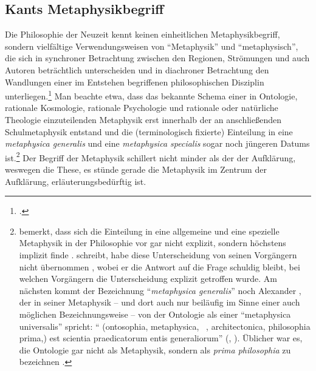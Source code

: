 \subsection{Kants
Metaphysikbegriff}\label{paragraph:facettendesmetaphysikbegriffs} Die
Philosophie der Neuzeit kennt keinen einheitlichen Metaphysikbegriff, sondern
vielfältige Verwendungsweisen von \enquote{Metaphysik} und
\enquote{metaphysisch}, die sich in synchroner Betrachtung zwischen den
Regionen, Strömungen und auch Autoren beträchtlich unterscheiden und in
diachroner Betrachtung den Wandlungen einer im Entstehen begriffenen
philosophischen Disziplin
unterliegen.\footnote{\cite[Vgl.][]{Borsche:ArtikelMetaphysikVI.Neuzeit1980}.}
Man beachte etwa, dass das bekannte Schema einer in Ontologie, rationale
Kosmologie, rationale Psychologie und rationale oder natürliche Theologie
einzuteilenden Metaphysik erst innerhalb der an
 anschließenden Schulmetaphysik entstand und die (terminologisch
fixierte) Einteilung in eine \textit{metaphysica generalis} und eine
\textit{metaphysica specialis} sogar noch jüngeren Datums
ist.\footnote{
bemerkt, dass sich die Einteilung in eine allgemeine und eine spezielle
Metaphysik in der Philosophie vor  gar nicht explizit,
sondern höchstens implizit finde
\parencite[vgl.][258--263]{Vollrath:DieGliederungderMetaphysikineineMetaphysicaGeneralisundeineMetaphysicaSpecialis1962}.
 schreibt,
 habe diese
Unterscheidung von seinen Vorgängern nicht übernommen
\parencite[vgl.][105]{Albrecht:ChristianWolffundderWolffianismus2014}, wobei er
die Antwort auf die Frage schuldig bleibt, bei welchen Vorgängern die
Unterscheidung explizit getroffen wurde. Am nächsten kommt der Bezeichnung
\enquote{\emph{metaphysica generalis}} noch Alexander
, der in seiner Metaphysik
-- und dort auch nur beiläufig im Sinne einer auch möglichen Bezeichnungsweise
-- von der Ontologie als einer \enquote{metaphysica universalis} spricht:
\enquote{ (ontosophia, metaphysica, \punkt\ , architectonica, philosophia prima,) est scientia praedicatorum
entis generaliorum}
\mkbibparens{\cite[][\S~4]{Baumgarten:Metaphysica---Metaphysik2011},
\cite[][XVII: 24.5--6]{Kant:GesammelteWerke1900ff.}}. Üblicher war es, die
Ontologie gar nicht als Metaphysik, sondern als \textit{prima philosophia} zu
bezeichnen \parencite[z.\,B.][]{Wolff:Philosophiaprimasiveontologia1977}.}
Der Begriff der Metaphysik schillert nicht minder als der der Aufklärung, weswegen die These, es
stünde gerade die Metaphysik im Zentrum der Aufklärung, erläuterungsbedürftig
ist.

